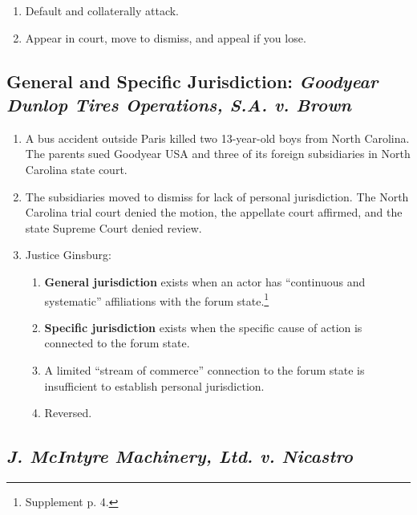 \begin{enumerate}
    \item Default and collaterally attack.
    \item Appear in court, move to dismiss, and appeal if you lose.
\end{enumerate}

\subsection{General and Specific Jurisdiction: \emph{Goodyear Dunlop Tires Operations, S.A. v. Brown}}

\begin{enumerate}
    \item A bus accident outside Paris killed two 13-year-old boys from North 
    Carolina. The parents sued Goodyear USA and three of its foreign 
    subsidiaries in North Carolina state court.
    \item The subsidiaries moved to dismiss for lack of personal jurisdiction. The North Carolina 
    trial court denied the motion, the appellate court affirmed, and the state 
    Supreme Court denied review.
    \item Justice Ginsburg:
    \begin{enumerate}
        \item \textbf{General jurisdiction} exists when an actor has 
        ``continuous and systematic'' affiliations with the forum 
        state.\footnote{Supplement p. 4.}
        \item \textbf{Specific jurisdiction} exists when the specific cause of 
        action is connected to the forum state.
        \item A limited ``stream of commerce'' connection to the forum state 
        is insufficient to establish personal jurisdiction.
        \item Reversed.
    \end{enumerate}
\end{enumerate}

\subsection{\emph{J. McIntyre Machinery, Ltd. v. Nicastro}}


